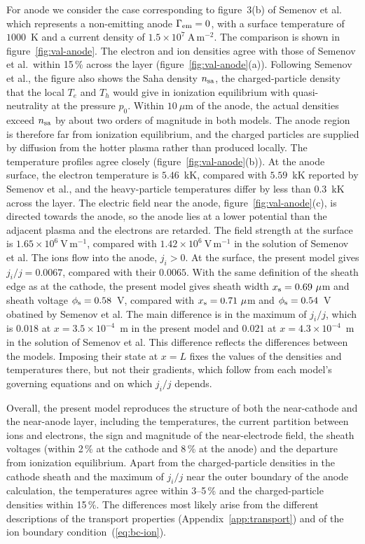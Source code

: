For anode we consider the case corresponding to figure~3(b) of Semenov et al.\ \cite{semenov2016numerical} which represents a non-emitting anode \(\Gamma_{\rm em}=0\), with a surface temperature of \(1000\)~K and a current density of \(1.5\times10^7\ \mathrm{A\,m^{-2}}\). The comparison is shown in figure~\ref{fig:val-anode}. The electron and ion densities agree with those of Semenov et al.\ within 15\,\% across the layer (figure~\ref{fig:val-anode}(a)). Following Semenov et al., the figure also shows the Saha density \(n_{\rm sa}\), the charged-particle density that the local \(T_e\) and \(T_h\) would give in ionization equilibrium with quasi-neutrality at the pressure \(p_0\). Within \(10\ \mu\)m of the anode, the actual densities exceed \(n_{\rm sa}\) by about two orders of magnitude in both models. The anode region is therefore far from ionization equilibrium, and the charged particles are supplied by diffusion from the hotter plasma rather than produced locally. The temperature profiles agree closely (figure~\ref{fig:val-anode}(b)). At the anode surface, the electron temperature is \(5.46\)~kK, compared with \(5.59\)~kK reported by Semenov et al., and the heavy-particle temperatures differ by less than \(0.3\)~kK across the layer. The electric field near the anode, figure~\ref{fig:val-anode}(c), is directed towards the anode, so the anode lies at a lower potential than the adjacent plasma and the electrons are retarded. The field strength at the surface is \(1.65\times10^6\ \mathrm{V\,m^{-1}}\), compared with \(1.42\times10^6\ \mathrm{V\,m^{-1}}\) in the solution of Semenov et al. The ions flow into the anode, \(j_i>0\). At the surface, the present model gives \(j_i/j=0.0067\), compared with their \(0.0065\). With the same definition of the sheath edge as at the cathode, the present model gives  sheath width \(x_{\rm s}=0.69\ \mu\)m and sheath voltage \(\phi_{\rm s}=0.58\)~V, compared with \(x_{\rm s}=0.71\ \mu\)m and \(\phi_{\rm s}=0.54\)~V obatined by Semenov et al. The main difference is in the maximum of \(j_i/j\), which is \(0.018\) at \(x=3.5\times10^{-4}\)~m in the present model and \(0.021\) at \(x=4.3\times10^{-4}\)~m in the solution of Semenov et al. This difference reflects the differences between the models. Imposing their state at \(x=L\) fixes the values of the densities and temperatures there, but not their gradients, which follow from each model's governing equations and on which \(j_i/j\) depends.

Overall, the present model reproduces the structure of both the near-cathode and the near-anode layer, including the temperatures, the current partition between ions and electrons, the sign and magnitude of the near-electrode field, the sheath voltages (within 2\,\% at the cathode and 8\,\% at the anode) and the departure from ionization equilibrium. Apart from the charged-particle densities in the cathode sheath and the maximum of \(j_i/j\) near the outer boundary of the anode calculation, the temperatures agree within 3--5\,\% and the charged-particle densities within 15\,\%. The differences most likely arise from the different descriptions of the transport properties (Appendix~\ref{app:transport}) and of the ion boundary condition~(\ref{eq:bc-ion}).
